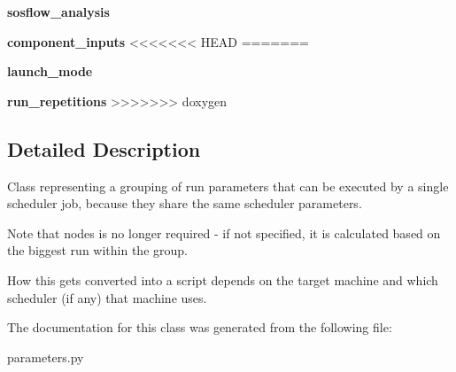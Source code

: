 \begin{DoxyCompactItemize}
{\bfseries sosflow\+\_\+analysis}
\item 
\mbox{\label{classcodar_1_1cheetah_1_1parameters_1_1_sweep_group_a4085f622e238b237b685ca82cf57ff0e}} 
{\bfseries component\+\_\+inputs}
<<<<<<< HEAD
=======
\item 
\mbox{\label{classcodar_1_1cheetah_1_1parameters_1_1_sweep_group_aab0922af464666db293542868a254191}} 
{\bfseries launch\+\_\+mode}
\item 
\mbox{\label{classcodar_1_1cheetah_1_1parameters_1_1_sweep_group_af2263721c5031a2a4dd85ae039f670d4}} 
{\bfseries run\+\_\+repetitions}
>>>>>>> doxygen
\end{DoxyCompactItemize}


\subsection{Detailed Description}
\begin{DoxyVerb}Class representing a grouping of run parameters that can be executed by
a single scheduler job, because they share the same scheduler parameters.

Note that nodes is no longer required - if not specified, it is calculated
based on the biggest run within the group.

How this gets converted into a script depends on the target machine and
which scheduler (if any) that machine uses.
\end{DoxyVerb}
 

The documentation for this class was generated from the following file\+:\begin{DoxyCompactItemize}
\item 
parameters.\+py\end{DoxyCompactItemize}
